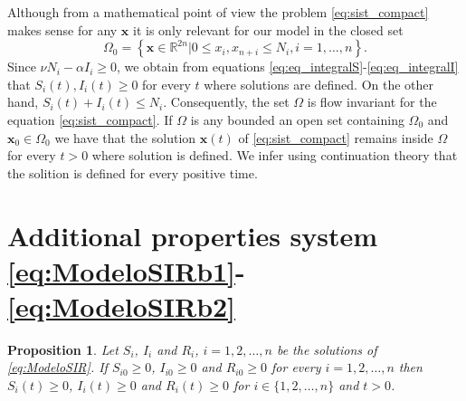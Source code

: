 \documentclass[a4paper,10pt]{article}
\newtheorem{prop}[thm]{Proposition}
\theoremstyle{remark}
\newcommand{\bm}[1]{\boldsymbol{#1}}
\begin{document}
Although from a mathematical point of view the problem \eqref{eq:sist_compact}    
 makes sense for any  $\bm{x}$ it is only relevant for our model  in the closed set   
\[
 \Omega_0=\left\{\bm{x}\in\mathbb{R}^{2n}|  0\leq x_i,x_{n+i}\leq N_i, i=1,\ldots,n\right\}.
\]
Since  $\nu N_i-\alpha I_i\geq 0$, we obtain from equations \eqref{eq:eq_integralS}-\eqref{eq:eq_integralI}  that $S_i(t), I_i(t)\geq 0$ for every $t$ where solutions are defined. On the other hand, $S_i(t)+I_i(t)\leq   N_i$. Consequently, the set $\Omega$ is flow invariant for the equation \eqref{eq:sist_compact}.  If $\Omega$ is any bounded an open set containing $\Omega_0$ and $\bm{x}_0\in\Omega_0$ we have that the solution $\bm{x}(t)$ of \eqref{eq:sist_compact} remains inside $\Omega$ for every $t>0$ where solution is defined.  We infer using continuation theory \cite[Th. 1.3]{EarlA.Coddington236} that the solition is defined for every positive time.  


\section{Additional properties system \eqref{eq:ModeloSIRb1}-\eqref{eq:ModeloSIRb2}}
\begin{prop} Let $S_i$, $I_i$ and $R_i$, $i=1,2,\ldots,n$ be the solutions of \eqref{eq:ModeloSIR}. If $S_{i0}\geq 0$, $I_{i0}\geq 0$ and $R_{i0}\geq 0$ for every $i=1,2,\ldots,n$ then $S_{i}(t)\geq 0$, $I_{i}(t)\geq 0$ and $R_{i}(t)\geq 0$ for  $i\in\{1,2,\ldots,n\}$ and  $t>0$.
\end{prop}
\end{document}
